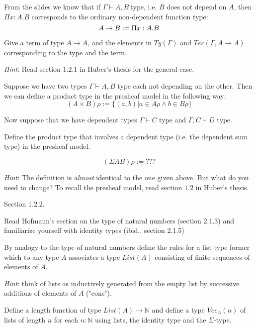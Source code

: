 \begin{exercise}
  From the slides we know that if $\Gamma \vdash A, B ~\text{type}$, i.e. $B$
  does not depend on $A$, then $\Pi x: A. B$ corresponds to the ordinary
  non-dependent function type:
  \begin{equation*}
    A \to B \vcentcolon= \Pi x: A. B
  \end{equation*}

  Give a term of type $A \to A$, and the elements in $\mathit{Ty}(\Gamma)$ and
  $\mathit{Ter}(\Gamma, A \to A)$ corresponding to the type and the term.

  \emph{Hint}: Read section $1.2.1$ in Huber's thesis for the general case.

\end{exercise}

\begin{exercise}
  Suppose we have two types $\Gamma \vdash A,B \text{ type}$ each not depending
  on the other.  Then we can define a product type in the presheaf model in the
  following way:
  \[
    (A \times B)\rho := \{(a,b) | a \in A\rho \land b \in B\rho\}
  \]

  Now suppose that we have dependent types $\Gamma \vdash C \text{ type}$ and
  $\Gamma, C \vdash D \text{ type}$.

  Define the product type that involves a dependent type (i.e. the dependent
  sum type) in the presheaf model.

  \[
    (\Sigma AB)\rho := ???
  \]

  \emph{Hint}: The definition is \emph{almost} identical to the one given
  above. But what do you need to change? To recall the presheaf model, read
  section $1.2$ in Huber's thesis.
\end{exercise}
\begin{answer}
  Section $1.2.2$.
\end{answer}

\begin{exercise}
  Read Hofmann's section on the type of natural numbers (section 2.1.3) and
  familiarize yourself with identity types (ibid., section 2.1.5)

  By analogy to the type of natural numbers define the rules for a list type
  former which to any type $A$ associates a type $\mathit{List}(A)$ consisting
  of finite sequences of elements of $A$.

  \emph{Hint}: think of lists as inductively generated from the empty list by
  successive additions of elements of $A$ ("cons").

  Define a length function of type $\mathit{List}(A) \to \mathbb{N}$ and define
  a type $\mathit{Vec}_A(n)$ of lists of length $n$ for each $n : \mathbb{N}$
  using lists, the identity type and the $\Sigma$-type.
\end{exercise}

